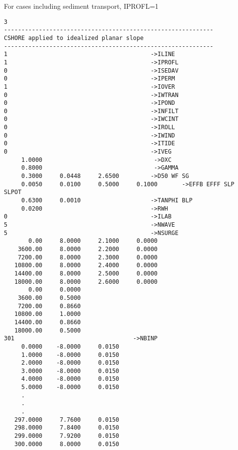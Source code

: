 \documentclass[11pt,oneside]{book}
\begin{document}
For cases including sediment transport, IPROFL=1
\begin{verbatim}
3 
------------------------------------------------------------ 
CSHORE applied to idealized planar slope 
------------------------------------------------------------ 
1                                         ->ILINE
1                                         ->IPROFL
0                                         ->ISEDAV
0                                         ->IPERM
1                                         ->IOVER
0                                         ->IWTRAN
0                                         ->IPOND
0                                         ->INFILT
0                                         ->IWCINT
0                                         ->IROLL 
0                                         ->IWIND 
0                                         ->ITIDE 
0                                         ->IVEG 
     1.0000                                ->DXC
     0.8000                                ->GAMMA 
     0.3000     0.0448     2.6500         ->D50 WF SG
     0.0050     0.0100     0.5000     0.1000       ->EFFB EFFF SLP  SLPOT
     0.6300     0.0010                    ->TANPHI BLP
     0.0200                               ->RWH 
0                                         ->ILAB
5                                         ->NWAVE 
5                                         ->NSURGE 
       0.00     8.0000     2.1000     0.0000
    3600.00     8.0000     2.2000     0.0000
    7200.00     8.0000     2.3000     0.0000
   10800.00     8.0000     2.4000     0.0000
   14400.00     8.0000     2.5000     0.0000
   18000.00     8.0000     2.6000     0.0000
       0.00     0.0000
    3600.00     0.5000
    7200.00     0.8660
   10800.00     1.0000
   14400.00     0.8660
   18000.00     0.5000
301                                  ->NBINP 
     0.0000    -8.0000     0.0150
     1.0000    -8.0000     0.0150
     2.0000    -8.0000     0.0150
     3.0000    -8.0000     0.0150
     4.0000    -8.0000     0.0150
     5.0000    -8.0000     0.0150
     .
     .
     .
   297.0000     7.7600     0.0150
   298.0000     7.8400     0.0150
   299.0000     7.9200     0.0150
   300.0000     8.0000     0.0150

\end{verbatim}
\end{document}
